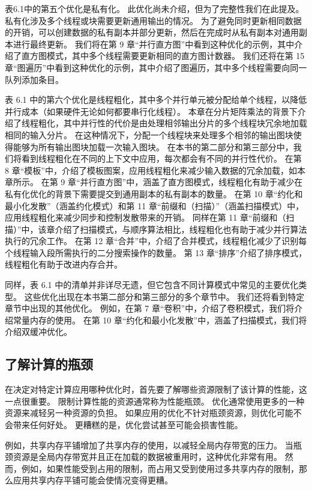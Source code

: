 表6.1中的第五个优化是私有化。 此优化尚未介绍，但为了完整性我们在此提及。 
私有化涉及多个线程或块需要更新通用输出的情况。 
为了避免同时更新相同数据的开销，可以创建数据的私有副本并部分更新，然后在完成时从私有副本对通用副本进行最终更新。 
我们将在第 9 章“并行直方图”中看到这种优化的示例，其中介绍了直方图模式，其中多个线程需要更新相同的直方图计数器。 
我们还将在第 15 章“图遍历”中看到这种优化的示例，其中介绍了图遍历，其中多个线程需要向同一队列添加条目。

表 6.1 中的第六个优化是线程粗化，其中多个并行单元被分配给单个线程，以降低并行成本（如果硬件无论如何都要串行化线程）。 
本章在分片矩阵乘法的背景下介绍了线程粗化，其中并行性的代价是由处理相邻输出分片的多个线程块冗余地加载相同的输入分片。 
在这种情况下，分配一个线程块来处理多个相邻的输出图块使得能够为所有输出图块加载一次输入图块。 
在本书的第二部分和第三部分中，我们将看到线程粗化在不同的上下文中应用，每次都会有不同的并行性代价。 
在第 8 章“模板”中，介绍了模板图案，应用线程粗化来减少输入数据的冗余加载，如本章所示。 
在第 9 章“并行直方图”中，涵盖了直方图模式，线程粗化有助于减少在私有化优化的背景下需要提交到通用副本的私有副本的数量。 
在第 10 章“约化和最小化发散”（涵盖约化模式）和第 11 章“前缀和（扫描）”（涵盖扫描模式）中，
应用线程粗化来减少同步和控制发散带来的开销。 
同样在第 11 章“前缀和（扫描）”中，该章介绍了扫描模式，与顺序算法相比，线程粗化也有助于减少并行算法执行的冗余工作。 
在第 12 章“合并”中，介绍了合并模式，线程粗化减少了识别每个线程输入段所需执行的二分搜索操作的数量。 
第 13 章“排序”介绍了排序模式，线程粗化有助于改进内存合并。

同样，表 6.1 中的清单并非详尽无遗，但它包含不同计算模式中常见的主要优化类型。 
这些优化出现在本书第二部分和第三部分的多个章节中。 我们还将看到特定章节中出现的其他优化。 
例如，在第 7 章“卷积”中，介绍了卷积模式，我们将介绍常量内存的使用。 
在第 10 章“约化和最小化发散”中，涵盖了扫描模式，我们将介绍双缓冲优化。

\subsection{了解计算的瓶颈}
在决定对特定计算应用哪种优化时，首先要了解哪些资源限制了该计算的性能，这一点很重要。 
限制计算性能的资源通常称为性能瓶颈。 优化通常使用更多的一种资源来减轻另一种资源的负担。 
如果应用的优化不针对瓶颈资源，则优化可能不会带来任何好处。 更糟糕的是，优化尝试甚至可能会损害性能。

例如，共享内存平铺增加了共享内存的使用，以减轻全局内存带宽的压力。 
当瓶颈资源是全局内存带宽并且正在加载的数据被重用时，这种优化非常有用。 
然而，例如，如果性能受到占用的限制，而占用又受到使用过多共享内存的限制，那么应用共享内存平铺可能会使情况变得更糟。

